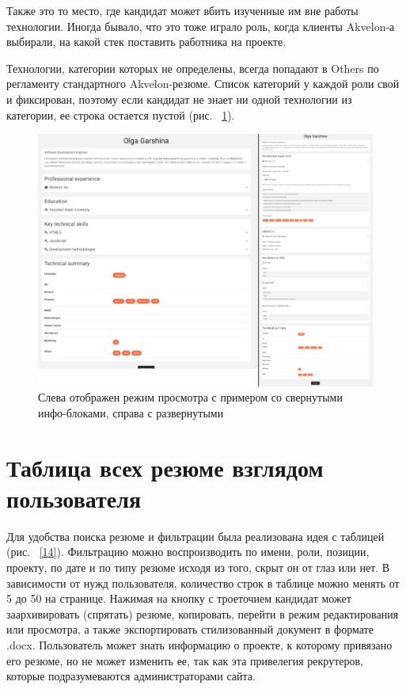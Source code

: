 \documentclass[a4paper,12pt]{diplom}
\begin{document}
Также это то место, где кандидат может вбить изученные им вне работы технологии. Иногда бывало, что это тоже играло роль, когда клиенты Akvelon-а выбирали, на какой стек поставить работника на проекте.

Технологии, категории которых не определены, всегда попадают в Others по регламенту стандартного Akvelon-резюме. Список категорий у каждой роли свой и фиксирован, поэтому если кандидат не знает ни одной технологии из категории, ее строка остается пустой (рис. ~\ref{13}).
\begin{figure}[!ht]
	\centering
	\includegraphics[width=1\textwidth]{resources/expand.png}
	\caption{Слева отображен режим просмотра с примером со свернутыми инфо-блоками, справа с развернутыми}
	\label{13}
\end{figure}
\section{Таблица всех резюме взглядом пользователя}

Для удобства поиска резюме и фильтрации была реализована идея с таблицей (рис. ~\ref{14}). Фильтрацию можно воспроизводить по имени, роли, позиции,
проекту, по дате и по типу резюме исходя из того, скрыт он от глаз или нет. В зависимости от нужд пользователя, количество строк в таблице можно менять от 5 до 50 на странице.
Нажимая на кнопку с троеточием кандидат может заархивировать (спрятать) резюме, копировать, перейти в режим редактирования или просмотра, а также экспортировать
стилизованный документ в формате .docx. Пользователь может знать информацию о проекте, к которому привязано его резюме, но не может изменить ее, так как эта привелегия рекрутеров, которые подразумеваются
администраторами сайта.
\end{document}
